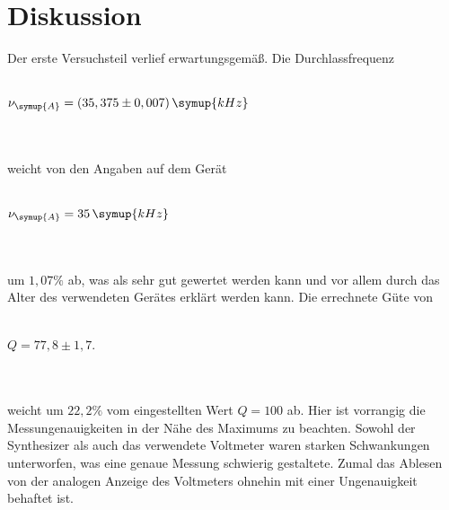 \section{Diskussion}
\label{sec:Diskussion}
Der erste Versuchsteil verlief erwartungsgemäß. Die Durchlassfrequenz
\\ \\
\centerline{$\nu_{\symup{A}} = (35,375 \pm 0,007) \, \symup{kHz}$}
\\ \\
weicht von den Angaben auf dem Gerät 
\\ \\
\centerline{$\nu_{\symup{A}} = 35 \, \symup{kHz}$}
\\ \\ 
um $1,07 \%$ ab, was als sehr gut gewertet werden kann und vor allem durch das Alter des verwendeten Gerätes erklärt werden kann.
Die errechnete Güte von 
\\ \\
\centerline{$Q = 77,8 \pm 1,7 $.}    
\\ \\
weicht um $22,2 \%$ vom eingestellten Wert $Q = 100$ ab. Hier ist vorrangig die Messungenauigkeiten in der Nähe des Maximums zu beachten. 
Sowohl der Synthesizer als auch das verwendete Voltmeter waren starken Schwankungen unterworfen, was eine genaue Messung schwierig gestaltete.
Zumal das Ablesen von der analogen Anzeige des Voltmeters ohnehin mit einer Ungenauigkeit behaftet ist.


